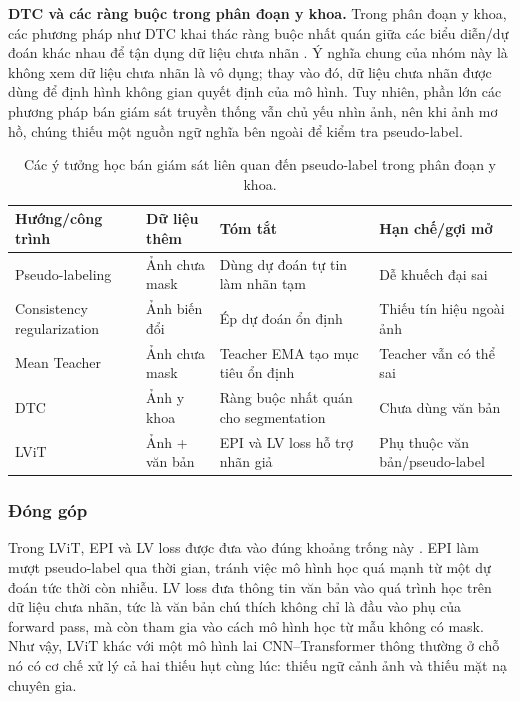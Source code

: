 \textbf{DTC và các ràng buộc trong phân đoạn y khoa.} Trong phân đoạn y khoa, các phương pháp như DTC khai thác ràng buộc nhất quán giữa các biểu diễn/dự đoán khác nhau để tận dụng dữ liệu chưa nhãn \cite{luo2021dtc}. Ý nghĩa chung của nhóm này là không xem dữ liệu chưa nhãn là vô dụng; thay vào đó, dữ liệu chưa nhãn được dùng để định hình không gian quyết định của mô hình. Tuy nhiên, phần lớn các phương pháp bán giám sát truyền thống vẫn chủ yếu nhìn ảnh, nên khi ảnh mơ hồ, chúng thiếu một nguồn ngữ nghĩa bên ngoài để kiểm tra pseudo-label.

\begin{table}[!t]
  \centering
  \caption{Các ý tưởng học bán giám sát liên quan đến pseudo-label trong phân đoạn y khoa.}
  \label{tab:ssl-related-works}
  \scriptsize
  \renewcommand{\arraystretch}{1.15}
  \setlength{\tabcolsep}{5pt}
  \begin{tabularx}{\textwidth}{@{}l L L L@{}}
    \toprule
    Hướng/công trình & Dữ liệu thêm & Tóm tắt & Hạn chế/gợi mở \\
    \midrule
    Pseudo-labeling & Ảnh chưa mask & Dùng dự đoán tự tin làm nhãn tạm & Dễ khuếch đại sai \\
    Consistency regularization & Ảnh biến đổi & Ép dự đoán ổn định & Thiếu tín hiệu ngoài ảnh \\
    Mean Teacher \cite{tarvainen2017meanteacher} & Ảnh chưa mask & Teacher EMA tạo mục tiêu ổn định & Teacher vẫn có thể sai \\
    DTC \cite{luo2021dtc} & Ảnh y khoa & Ràng buộc nhất quán cho segmentation & Chưa dùng văn bản \\
    LViT \cite{li2023lvit} & Ảnh + văn bản & EPI và LV loss hỗ trợ nhãn giả & Phụ thuộc văn bản/pseudo-label \\
    \bottomrule
  \end{tabularx}
\end{table}
\FloatBarrier

\subsubsection{Đóng góp}

Trong LViT, EPI và LV loss được đưa vào đúng khoảng trống này \cite{li2023lvit}. EPI làm mượt pseudo-label qua thời gian, tránh việc mô hình học quá mạnh từ một dự đoán tức thời còn nhiễu. LV loss đưa thông tin văn bản vào quá trình học trên dữ liệu chưa nhãn, tức là văn bản chú thích không chỉ là đầu vào phụ của forward pass, mà còn tham gia vào cách mô hình học từ mẫu không có mask. Như vậy, LViT khác với một mô hình lai CNN--Transformer thông thường ở chỗ nó có cơ chế xử lý cả hai thiếu hụt cùng lúc: thiếu ngữ cảnh ảnh và thiếu mặt nạ chuyên gia.

